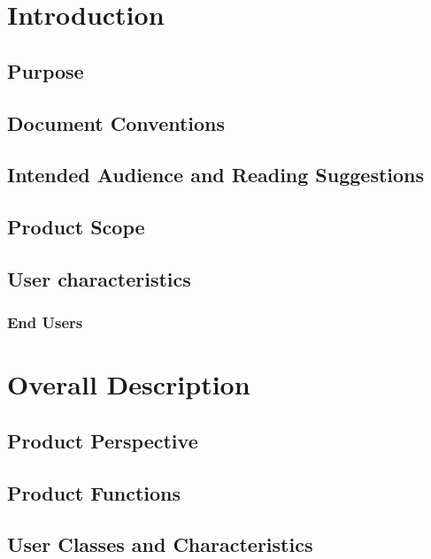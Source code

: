     \chapter{Introduction}\label{ch:Introduction}
        \section{Purpose}
            
        \section{Document Conventions}
            
        \section{Intended Audience and Reading Suggestions}
            
        \section{Product Scope}
            
        \section{User characteristics}
            
        \subsection{End Users}
    
    \newpage
    \chapter{Overall Description}\label{ch:Overall Description}
        \section{Product Perspective}    
        \section{Product Functions}
        \section{User Classes and Characteristics}
